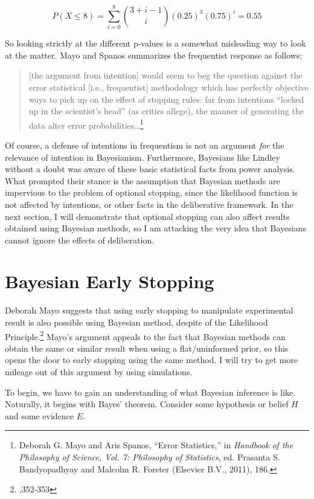 \[P(X \leq 8) =  \sum_{i=0}^{8} {3+i-1 \choose i} (0.25)^3 (0.75)^{i} =0.55\]

So looking strictly at the different p-values is a somewhat misleading
way to look at the matter. Mayo and Spanos summarizes the frequentist
response as follows:

\begin{quote}
{[}the argument from intention{]} would seem to beg the question against
the error statistical {[}i.e., frequentist{]} methodology which has
perfectly objective ways to pick up on the effect of stopping rules: far
from intentions ``locked up in the scientist's head'' (as critics
allege), the manner of generating the data alter error
probabilities\ldots{}\footnote{Deborah G. Mayo and Aris Spanos, ``Error
  Statistics,'' in \emph{Handbook of the Philosophy of Science, Vol. 7:
  Philosophy of Statistics}, ed. Prasanta S. Bandyopadhyay and Malcolm
  R. Forster (Elsevier B.V., 2011), 186.}
\end{quote}

Of course, a defense of intentions in frequentism is not an argument
\emph{for} the relevance of intention in Bayesianism. Furthermore,
Bayesians like Lindley without a doubt was aware of these basic
statistical facts from power analysis. What prompted their stance is the
assumption that Bayesian methods are impervious to the problem of
optional stopping, since the likelihood function is not affected by
intentions, or other facts in the deliberative framework. In the next
section, I will demonstrate that optional stopping can also affect
results obtained using Bayesian methods, so I am attacking the very idea
that Bayesians cannot ignore the effects of deliberation.

\hypertarget{bayesian-early-stopping}{%
\section{Bayesian Early
Stopping}\label{bayesian-early-stopping}}

Deborah Mayo suggests that using early stopping to manipulate experimental result is also possible using Bayesian method, despite of the Likelihood Principle.\footnote{\cite{errorgrowth},352-353} Mayo's argument appeals to the fact that Bayesian methods can obtain the same or similar result when using a flat/uninformed prior, so this opens the door to early stopping using the same method. I will try to get more mileage out of this argument by using simulations.

To begin, we have to gain an understanding of what Bayesian inference is
like. Naturally, it begins with Bayes' theorem. Consider some hypothesis
or belief \(H\) and some evidence \(E\).

